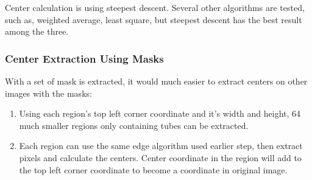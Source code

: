 Center calculation is using steepest descent. Several other algorithms are tested, such as, weighted average,
least square, but steepest descent has the best result among the three.

\subsubsection{Center Extraction Using Masks}

With a set of mask is extracted, it would much easier to extract centers on other images with the masks:
\begin{enumerate}
\item Using each region's top left corner coordinate and it's width and height, 64 much smaller regions only
  containing tubes can be extracted. 
\item Each region can use the same edge algorithm used earlier step, then extract pixels and calculate the
  centers. Center coordinate in the region will add to the top left corner coordinate to become a coordinate
  in original image.
\end{enumerate}


